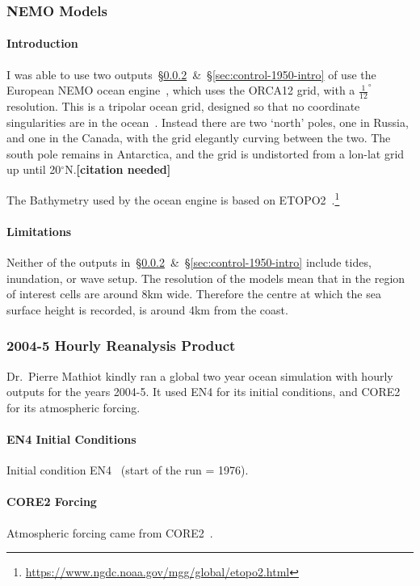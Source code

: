 \subsubsection{NEMO Models}
\paragraph{Introduction}
I was able to use two outputs~§\ref{sec:rean-prod}~\&~§\ref{sec:control-1950-intro}
of use the European NEMO ocean engine~\cite{madec2015nemo}, which uses the ORCA12 grid, with a  $\frac{1}{12}^{\circ}$
resolution.
This is a tripolar ocean grid, designed so that no coordinate singularities are in the ocean~\cite{madec1996global}.
Instead there are two `north' poles, one in Russia, and one in the Canada,
with the grid elegantly curving between the two.
The south pole remains in Antarctica, and the grid is undistorted from a lon-lat
 grid up until 20$^{\circ}$N.\textbf{[citation needed]}

 The Bathymetry used by the ocean engine is based on
 ETOPO2~\cite{lecointre2011definition,noaa20062}.\footnote{\url{https://www.ngdc.noaa.gov/mgg/global/etopo2.html}}

\paragraph{Limitations}

Neither of the outputs in~§\ref{sec:rean-prod}~\&~§\ref{sec:control-1950-intro}
include tides, inundation, or wave setup.
The resolution of the models mean that in the region of interest cells are around
8km wide. Therefore the centre at which the sea surface height is recorded,
is around 4km from the coast.

\subsubsection{2004-5 Hourly Reanalysis Product}
\label{sec:rean-prod}
Dr.~Pierre Mathiot kindly ran a global two year ocean simulation with
hourly outputs for the years 2004-5. It used EN4 for its initial conditions,
and CORE2 for its atmospheric forcing.

\paragraph{EN4 Initial Conditions}

Initial condition EN4~\cite{good2013en4, HadObs} (start of the run = 1976).

\paragraph{CORE2 Forcing}

Atmospheric forcing came from CORE2~\cite{griffies2012datasets,large2009global}.
